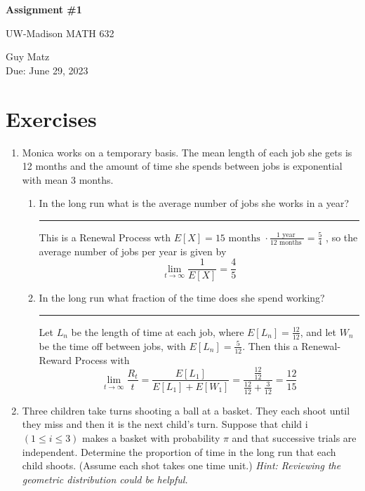 \documentclass{article} %
\theoremstyle{plain}
\theoremstyle{case}
\begin{document}
\begin{center}
\Large{\textbf{Assignment \#1}
            
UW-Madison MATH 632} %
\vspace{5pt}
        
\normalsize{  Guy Matz%
        \\ Due: June 29, 2023}
\vspace{15pt}
\end{center}

\section*{Exercises}%
\begin{enumerate}[label={\fbox{\textbf{Exercise \#\arabic* :}}}]
  \item Monica works on a temporary basis. The mean length of each job she
    gets is 12 months and the amount of time she spends between jobs
    is exponential with mean 3 months.
    \begin{enumerate}
      \item In the long run what is the average number of jobs she works in a year?

\par\noindent\rule{\textwidth}{0.1pt}
        This is a Renewal Process wth $E[X] = 15 \text{ months } \cdot 
        \frac{1 \text{ year }}{12 \text{ months }} = \frac{5}{4} $ ,
        so the average number of jobs per year is given by
        \[ \lim_{t \to \infty} \frac{1}{E[X]}  = \frac{4}{5}  \]

      \item  In the long run what fraction of the time does she spend working?

\par\noindent\rule{\textwidth}{0.1pt}
        Let $L_n$ be the length of time at each job, where $E[L_n] = 
        \frac{12}{12}$, and let $W_n$ be the time off between jobs, with
        $E[L_n] = \frac{5}{12}$.
        Then this a Renewal-Reward Process with 
        \[ \lim_{t \to \infty} \frac{R_t}{t} =
        \frac{E[L_1]}{E[L_1] + E[W_1]}  = \frac{\frac{12}{12}}{\frac{12}{12} + \frac{3}{12} } = \frac{12}{15}    \]

    \end{enumerate}
  \newpage
  \item Three children take turns shooting a ball at a basket. They each
    shoot until they miss and then it is the next child’s turn. Suppose
    that child i $(1 \leq i \leq 3)$ makes a basket with probability $\pi$
    and that successive trials are independent. Determine the proportion of
    time in the long run that each child shoots. (Assume each shot takes
    one time unit.) \emph{Hint: Reviewing the geometric distribution
      could be helpful.}


\end{enumerate}
\end{document}
